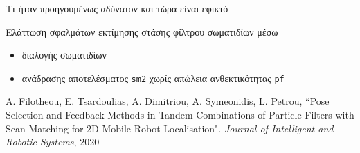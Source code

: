 \begin{frame}{Τι ήταν προηγουμένως αδύνατον και τώρα είναι εφικτό}

  \vspace{2cm}
  Ελάττωση σφαλμάτων εκτίμησης στάσης φίλτρου σωματιδίων μέσω

  \begin{itemize}
    \item διαλογής σωματιδίων
    \item ανάδρασης αποτελέσματος \texttt{sm2} χωρίς απώλεια ανθεκτικότητας \texttt{pf}
  \end{itemize}



  \placebottom
  \tiny A. Filotheou, E. Tsardoulias, A. Dimitriou, A. Symeonidis, L. Petrou, ``Pose Selection and Feedback Methods in Tandem Combinations of Particle Filters with Scan-Matching for 2D Mobile Robot Localisation". \textit{Journal of Intelligent and Robotic Systems}, 2020
\end{frame}
